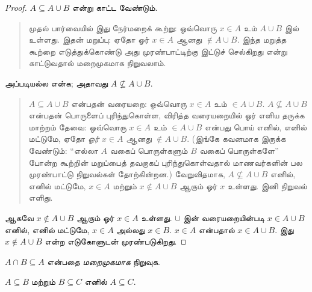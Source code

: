\documentclass[../../../include/open-logic-section]{subfiles}
\begin{document}
\begin{proof}
  $A \subseteq A \cup B$ என்று காட்ட வேண்டும்.
  \begin{quote}
    முதல் பார்வையில் இது நேர்மறைக் கூற்று: ஒவ்வொரு
    $x \in A$ உம் $A \cup B$ இல் உள்ளது.
    இதன் மறுப்பு: ஏதோ ஓர் $x \in A$ ஆனது
    $\notin A \cup B$. இந்த மறுத்த கூற்றை
    எடுத்துக்கொண்டு அது முரண்பாட்டிற்கு இட்டுச்
    செல்கிறது என்று காட்டுவதால் மறைமுகமாக நிறுவலாம்.
  \end{quote}
  அப்படியல்ல என்க; அதாவது $A \nsubseteq A \cup B$.
  \begin{quote}
    $A \subseteq A \cup B$ என்பதன் வரையறை:
    ஒவ்வொரு $x \in A$ உம் $\in A \cup B$.
    $A \nsubseteq A \cup B$ என்பதன் பொருளைப்
    புரிந்துகொள்ள, விரித்த வரையறையில் ஓர் எளிய
    தருக்க மாற்றம் தேவை: ஒவ்வொரு $x \in A$
    உம் $\in A \cup B$ என்பது பொய் எனில்,
    எனில் மட்டுமே, ஏதோ \emph{ஓர்} $x \in A$
    ஆனது $\notin A \cup B$. (இங்கே கவனமாக
    இருக்க வேண்டும்: ``எல்லா $A$ வகைப் பொருள்களும் $B$ வகைப் பொருள்களே'' போன்ற
    கூற்றின் மறுப்பைத் தவறாகப் புரிந்துகொள்வதால்
    மாணவர்களின் பல முரண்பாட்டு நிறுவல்கள் தோற்கின்றன.)
    வேறுவிதமாக, $A \nsubseteq A \cup B$ எனில்,
    எனில் மட்டுமே, $x \in A$ மற்றும்
    $x \notin A \cup B$ ஆகும் ஓர் $x$ உள்ளது.
    இனி நிறுவல் எளிது.
  \end{quote}
  ஆகவே $x \notin A \cup B$ ஆகும் ஓர் $x \in A$
  உள்ளது. $\cup$ இன் வரையறையின்படி
  $x \in A \cup B$ எனில், எனில் மட்டுமே,
  $x \in A$ அல்லது $x \in B$. $x \in A$
  என்பதால் $x \in A \cup B$. இது
  $x \notin A \cup B$ என்ற எடுகோளுடன் முரண்படுகிறது.
\end{proof}

\begin{prob}
$A \cap B \subseteq A$ என்பதை \emph{மறைமுகமாக}
நிறுவுக.
\end{prob}

\begin{prop}
$A \subseteq B$ மற்றும் $B \subseteq C$ எனில்
$A \subseteq C$.
\end{prop}
\end{document}
